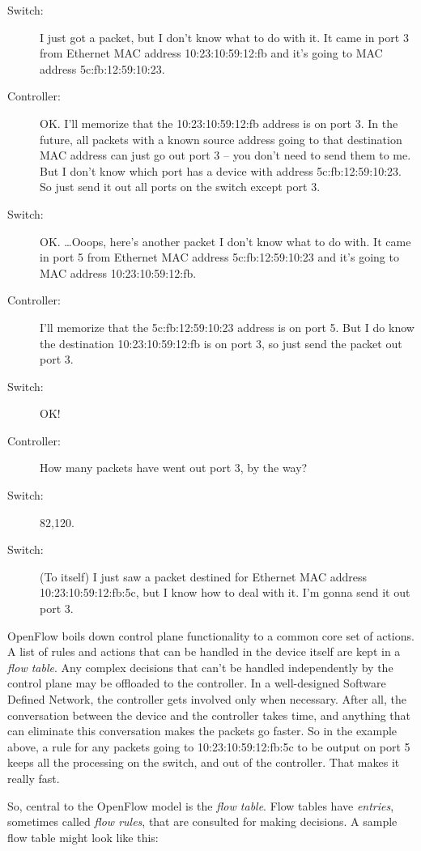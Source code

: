 \begin{description}
\item[Switch:] I just got a packet, but I don't know what to do with it.
It came in port 3 from Ethernet MAC address 10:23:10:59:12:fb and it's going to MAC address 5c:fb:12:59:10:23.
\item[Controller:] OK.    
I'll memorize that the 10:23:10:59:12:fb address is on port 3.
In the future, all packets with a known source address going to that destination MAC address can just go out port 3 --
you don't need to send them to me.  
But I don't know which port has a device with address 5c:fb:12:59:10:23.
So just send it out all ports on the switch except port 3.  
\item[Switch:] OK. \ldots Ooops, here's another packet I don't know what to do with.  
It came in port 5 from Ethernet MAC address 5c:fb:12:59:10:23 and it's going to MAC address 10:23:10:59:12:fb.
\item[Controller:] I'll memorize that the 5c:fb:12:59:10:23 address is on port 5.
But I do know the destination 10:23:10:59:12:fb is on port 3, so just send the packet out port 3. 
\item[Switch:] OK!
\item[Controller:] How many packets have went out port 3, by the way?
\item[Switch:] 82,120.
\item[Switch:] (To itself) I just saw a packet destined for Ethernet MAC address 10:23:10:59:12:fb:5c, but I know how to deal with it.  I'm gonna send it out port 3.  
\end{description}

OpenFlow boils down control plane functionality to a common core set of actions.
A list of rules and actions that can be handled in the device itself are kept in a \textit{flow table}.
Any complex decisions that can't be handled independently by the control plane may be offloaded to the controller.  
In a well-designed Software Defined Network, the controller gets involved only when necessary.
After all, the conversation between the device and the controller takes time, and anything that can 
eliminate this conversation makes the packets go faster.
So in the example above, a rule for any packets going to 10:23:10:59:12:fb:5c to be output on port 5 keeps all the processing on the switch, and out of the controller.  
That makes it really fast.  

So, central to the OpenFlow model is the \textit{flow table}.  
Flow tables have \textit{entries}, sometimes called \textit{flow rules}, that are consulted for making decisions.
A sample flow table might look like this:

